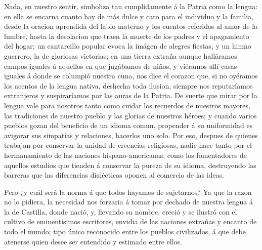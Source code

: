 ﻿\documentclass{book}
\begin{document}
Nada, en nuestro sentir, simboliza tan cumplidamente á la Patria como la lengua: en ella se encarna cuanto hay de más dulce y caro para el individuo y la familia, desde la oracion aprendida del labio materno y los cuentos referidos al amor de la lumbre, hasta la desolacion que traen la muerte de los padres y el apagamiento del hogar; un cantarcillo popular evoca la imágen de alegres fiestas, y un himno guerrero, la de gloriosas victorias; en una tierra extraña aunque halláramos campos iguales á aquellos en que jugábamos de niños, y viéramos allí casas iguales á donde se columpió nuestra cuna, nos dice el corazon que, si no oyéramos los acentos de la lengua nativa, deshecha toda ilusion, siempre nos reputaríamos extranjeros y suspiraríamos por las auras de la Patria. De suerte que mirar por la lengua vale para nosotros tanto como cuidar los recuerdos de nuestros mayores, las tradiciones de nuestro pueblo y las glorias de nuestros héroes; y cuando varios pueblos gozan del beneficio de un idioma comun, propender á su uniformidad es avigorar sus simpatías y relaciones, hacerlos uno solo. Por eso, despues de quienes trabajan por conservar la unidad de creencias religiosas, nadie hace tanto por el hermanamiento de las naciones hispano-americanas, como los fomentadores de aquellos estudios que tienden á conservar la pureza de su idioma, destruyendo las barreras que las diferencias dialécticas oponen al comercio de las ideas. 

Pero ¿y cuál será la norma á que todos hayamos de sujetarnos? Ya que la razon no lo pidiera, la necesidad nos forzaria á tomar por dechado de nuestra lengua á la de Castilla, donde nació, y, llevando su nombre, creció y se ilustró con el cultivo de eminentísimos escritores, envidia de las naciones extrañas y encanto de todo el mundo; tipo único reconocido entre los pueblos civilizados, á que debe atenerse quien desee ser entendido y estimado entre ellos.
\end{document}

